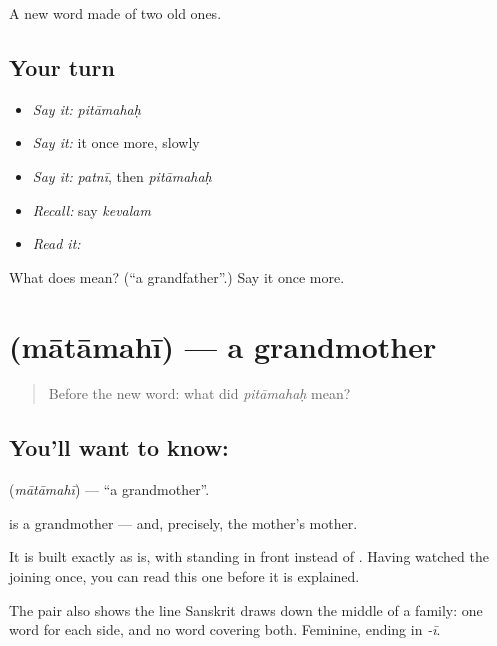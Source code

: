 \begin{grammarlens}[title={What you've built}]
A new word made of two old ones.
\end{grammarlens}

\subsection*{Your turn}
\begin{itemize}
\raggedright
  \item \emph{Say it:} \emph{pitāmahaḥ}
  \item \emph{Say it:} it once more, slowly
  \item \emph{Say it:} \emph{patnī}, then \emph{pitāmahaḥ}
  \item \emph{Recall:} say \emph{kevalam}
  \item \emph{Read it:} \textbf{}
\end{itemize}

\begin{tcolorbox}[breakable,colback=teal!4,colframe=teal!35!black,title={Before you move on}]
What does  mean? (\textquotedblleft{}a grandfather\textquotedblright{}.) Say it once more.
\end{tcolorbox}
\section[\texorpdfstring{\sk{मातामही} (mātāmahī)}{मातामही (mātāmahī)}]{ (mātāmahī) — a grandmother}

\label{lesson:SA-C51-grandmother}



\begin{quote}
Before the new word: what did \emph{pitāmahaḥ} mean?
\end{quote}

\subsection*{You'll want to know: }
\textbf{} (\emph{mātāmahī}) — \textquotedblleft{}a grandmother\textquotedblright{}.

\textbf{} is a grandmother — and, precisely, the mother's mother.

It is built exactly as  is, with  standing in front instead of . Having watched the joining once, you can read this one before it is explained.

The pair also shows the line Sanskrit draws down the middle of a family: one word for each side, and no word covering both. Feminine, ending in \emph{-ī}.

